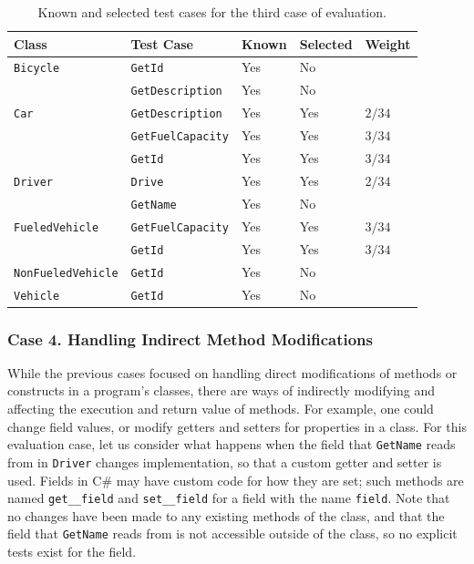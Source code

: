 \documentclass[a4paper,english,12pt]{report}
\newcommand{\textcf}{\texttt}
\begin{document}
\begin{table}[htbp]
  \centering
  \begin{tabular}{|l|l|l|l|l|}
    \hline
    \textbf{Class} & \textbf{Test Case} & \textbf{Known} & \textbf{Selected} & \textbf{Weight}\\
    \hline
    \textcf{Bicycle} & \textcf{GetId} & Yes & No &\\
            & \textcf{GetDescription} & Yes & No &\\
    \hline
    \textcf{Car} & \textcf{GetDescription} & Yes & Yes & $2/34$\\
        & \textcf{GetFuelCapacity} & Yes & Yes & $3/34$\\
        & \textcf{GetId} & Yes & Yes & $3/34$\\
    \hline
    \textcf{Driver} & \textcf{Drive} & Yes & Yes & $2/34$\\
           & \textcf{GetName} & Yes & No &\\
    \hline
    \textcf{FueledVehicle} & \textcf{GetFuelCapacity} & Yes & Yes & $3/34$\\
                  & \textcf{GetId} & Yes & Yes & $3/34$\\
    \hline
    \textcf{NonFueledVehicle} & \textcf{GetId} & Yes & No &\\
    \hline
    \textcf{Vehicle} & \textcf{GetId} & Yes & No &\\
    \hline
  \end{tabular}
  \caption{Known and selected test cases for the third case of evaluation.}
  \label{tab:evaluation-case3-selected}
\end{table}

\subsubsection{Case 4. Handling Indirect Method Modifications}
While the previous cases focused on handling direct modifications of methods or constructs in a program's classes, there are ways of indirectly modifying and affecting the execution and return value of methods. For example, one could change field values, or modify getters and setters for properties in a class. For this evaluation case, let us consider what happens when the field that \textcf{GetName} reads from in \textcf{Driver} changes implementation, so that a custom getter and setter is used. Fields in C\# may have custom code for how they are set; such methods are named \textcf{get\_\_}\textcf{field} and \textcf{set\_\_}\textcf{field} for a field with the name \textcf{field}. Note that no changes have been made to any existing methods of the class, and that the field that \textcf{GetName} reads from is not accessible outside of the class, so no explicit tests exist for the field.
\end{document}

